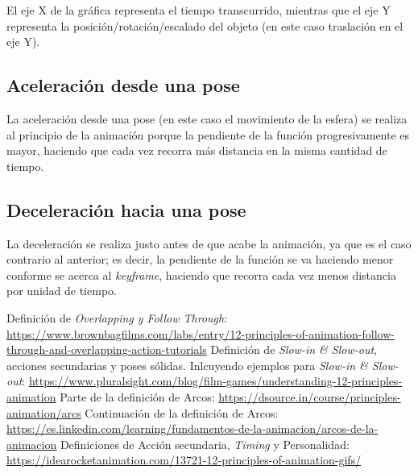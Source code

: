 \documentclass{article}
\begin{document}
El eje X de la gráfica representa el tiempo transcurrido, mientras que el eje Y representa la posición/rotación/escalado del objeto (en este caso traslación en el eje Y).

\subsection{Aceleración desde una pose}
La aceleración desde una pose (en este caso el movimiento de la esfera) se realiza al principio de la animación porque la pendiente de la función progresivamente es mayor, haciendo que cada vez recorra más distancia en la misma cantidad de tiempo.
\subsection{Deceleración hacia una pose}

La deceleración se realiza justo antes de que acabe la animación, ya que es el caso contrario al anterior; es decir, la pendiente de la función se va haciendo menor conforme se acerca al \textit{keyframe}, haciendo que recorra cada vez menos distancia por unidad de tiempo.

\newpage

\begin{thebibliography}{1}
     Definición de \textit{Overlapping y Follow Through}: \url{https://www.brownbagfilms.com/labs/entry/12-principles-of-animation-follow-through-and-overlapping-action-tutorials} 
     Definición de \textit{Slow-in \& Slow-out}, acciones secundarias y poses sólidas. Inlcuyendo ejemplos para \textit{Slow-in \& Slow-out}: \url{https://www.pluralsight.com/blog/film-games/understanding-12-principles-animation}
     Parte de la definición de Arcos: \url{https://dsource.in/course/principles-animation/arcs}
     Continuación de la definición de Arcos: \url{https://es.linkedin.com/learning/fundamentos-de-la-animacion/arcos-de-la-animacion}
     Definiciones de Acción secundaria, \textit{Timing} y Personalidad: \url{https://idearocketanimation.com/13721-12-principles-of-animation-gifs/}
\end{thebibliography}
\end{document}
